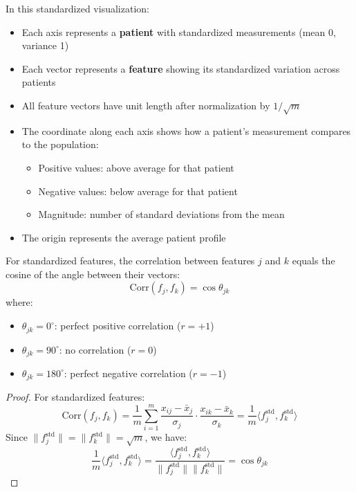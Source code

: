 \begin{notechapter}
\begin{remark}
In this standardized visualization:
\begin{itemize}
    \item Each axis represents a \textbf{patient} with standardized measurements (mean 0, variance 1)
    \item Each vector represents a \textbf{feature} showing its standardized variation across patients
    \item All feature vectors have unit length after normalization by $1/\sqrt{m}$
    \item The coordinate along each axis shows how a patient's measurement compares to the population:
    \begin{itemize}
        \item Positive values: above average for that patient
        \item Negative values: below average for that patient
        \item Magnitude: number of standard deviations from the mean
    \end{itemize}
    \item The origin represents the average patient profile
\end{itemize}
\end{remark}

\begin{theorem}
For standardized features, the correlation between features $j$ and $k$ equals the cosine of the angle between their vectors:
\[
\text{Corr}(f_j, f_k) = \cos\theta_{jk}
\]
where:
\begin{itemize}
    \item $\theta_{jk} = 0^\circ$: perfect positive correlation ($r = +1$)
    \item $\theta_{jk} = 90^\circ$: no correlation ($r = 0$)
    \item $\theta_{jk} = 180^\circ$: perfect negative correlation ($r = -1$)
\end{itemize}
\end{theorem}

\begin{proof}
For standardized features:
\[
\text{Corr}(f_j, f_k) = \frac{1}{m}\sum_{i=1}^m \frac{x_{ij} - \bar{x}_j}{\sigma_j} \cdot \frac{x_{ik} - \bar{x}_k}{\sigma_k} = \frac{1}{m}\langle f_j^{\text{std}}, f_k^{\text{std}} \rangle
\]
Since $\|f_j^{\text{std}}\| = \|f_k^{\text{std}}\| = \sqrt{m}$, we have:
\[
\frac{1}{m}\langle f_j^{\text{std}}, f_k^{\text{std}} \rangle = \frac{\langle f_j^{\text{std}}, f_k^{\text{std}} \rangle}{\|f_j^{\text{std}}\|\|f_k^{\text{std}}\|} = \cos\theta_{jk}
\]
\end{proof}


\end{notechapter}
